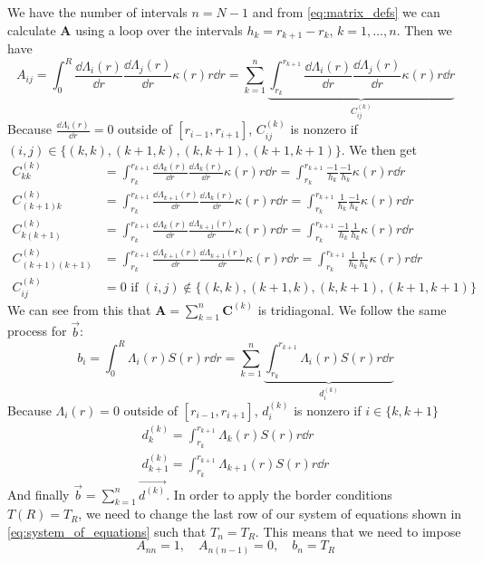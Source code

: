 We have the number of intervals $n = N-1$ and from \autoref{eq:matrix_defs} we can calculate \(\mathbf{A}\) using a loop over the intervals \(h_k = r_{k+1} - r_k\), \(k = 1, \dots, n\). Then we have
\begin{equation}
    A_{ij}
    = \int_0^R \frac{\dd \Lambda_i(r)}{\dd r} \frac{\dd \Lambda_j(r)}{\dd r} \kappa(r) r \dd r
    = \sum_{k=1}^n \underbrace{\int_{r_k}^{r_{k+1}} \frac{\dd \Lambda_i(r)}{\dd r} \frac{\dd \Lambda_j(r)}{\dd r} \kappa(r) r \dd r}_{C_{ij}^{(k)}}
\end{equation}
Because \(\frac{\dd \Lambda_i(r)}{\dd r} = 0\) outside of \([r_{i-1}, r_{i+1}]\), \(C^{(k)}_{ij}\) is nonzero if \((i,j) \in \{(k,k), (k+1,k), (k,k+1), (k+1,k+1)\}\). We then get
\begin{align*}
    C^{(k)}_{kk} &= \int_{r_{k}}^{r_{k+1}} \frac{\dd \Lambda_{k}(r)}{\dd r} \frac{\dd \Lambda_{k}(r)}{\dd r} \kappa(r) r \dd r = \int_{r_{k}}^{r_{k+1}} \frac{-1}{h_k} \frac{-1}{h_k} \kappa(r) r \dd r \\
    C^{(k)}_{(k+1)k} &= \int_{r_{k}}^{r_{k+1}} \frac{\dd \Lambda_{k+1}(r)}{\dd r} \frac{\dd \Lambda_{k}(r)}{\dd r} \kappa(r) r \dd r = \int_{r_{k}}^{r_{k+1}} \frac{1}{h_k} \frac{-1}{h_k} \kappa(r) r \dd r \\
    C^{(k)}_{k(k+1)} &= \int_{r_{k}}^{r_{k+1}} \frac{\dd \Lambda_{k}(r)}{\dd r} \frac{\dd \Lambda_{k+1}(r)}{\dd r} \kappa(r) r \dd r = \int_{r_{k}}^{r_{k+1}} \frac{-1}{h_k} \frac{1}{h_k} \kappa(r) r \dd r \\
    C^{(k)}_{(k+1)(k+1)} &= \int_{r_{k}}^{r_{k+1}} \frac{\dd \Lambda_{k+1}(r)}{\dd r} \frac{\dd \Lambda_{k+1}(r)}{\dd r} \kappa(r) r \dd r = \int_{r_{k}}^{r_{k+1}} \frac{1}{h_k} \frac{1}{h_k} \kappa(r) r \dd r \\
    C^{(k)}_{ij} &= 0 \textrm{ if } (i,j) \notin \{(k,k), (k+1,k), (k,k+1), (k+1,k+1)\}
\end{align*}
We can see from this that \(\mathbf{A} = \sum_{k=1}^{n} \mathbf{C}^{(k)}\) is tridiagonal. We follow the same process for \(\vec{b}\):
\begin{equation}
    b_i = \int_0^R \Lambda_i(r) S(r) r \dd r = \sum_{k=1}^{n} \underbrace{\int_{r_k}^{r_{k+1}} \Lambda_i(r) S(r) r \dd r}_{d^{(k)}_i}
\end{equation}
Because \(\Lambda_i(r) = 0\) outside of \([r_{i-1}, r_{i+1}]\), \(d^{(k)}_i\) is nonzero if \(i \in \{k, k+1\}\)
\begin{align*}
    d^{(k)}_k = \int_{r_k}^{r_{k+1}} \Lambda_k(r) S(r) r \dd r \\
    d^{(k)}_{k+1} = \int_{r_k}^{r_{k+1}} \Lambda_{k+1}(r) S(r) r \dd r
\end{align*}
And finally \(\vec{b} = \sum_{k=1}^{n} \overrightarrow{d^{(k)}}\). In order to apply the border conditions \(T(R) = T_R\), we need to change the last row of our system of equations shown in \autoref{eq:system_of_equations} such that \(T_n = T_R\). This means that we need to impose
\begin{equation}
    A_{nn} = 1, \quad A_{n(n-1)} = 0, \quad b_n = T_R
\end{equation}

